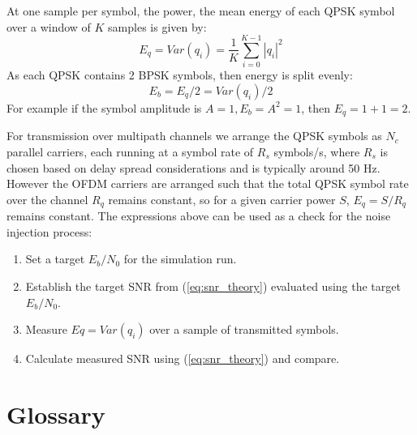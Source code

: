 \documentclass{article}
\begin{document}
At one sample per symbol, the power, the mean energy of each QPSK symbol over a window of $K$ samples is given by:
\begin{equation}
E_q = Var(q_i) = \frac{1}{K}\sum_{i=0}^{K-1}|q_i|^2
\end{equation}
As each QPSK contains 2 BPSK symbols, then energy is split evenly:
\begin{equation}
E_b = E_q/2 = Var(q_i)/2
\end{equation}
For example if the symbol amplitude is $A=1, E_b=A^2=1$, then $E_q=1+1=2$.

For transmission over multipath channels we arrange the QPSK symbols as $N_c$ parallel carriers, each running at a symbol rate of $R_s$ symbols/s, where $R_s$ is chosen based on delay spread considerations and is typically around 50 Hz.  However the OFDM carriers are arranged such that the total QPSK symbol rate over the channel $R_q$ remains constant, so for a given carrier power $S$, $E_q=S/R_q$ remains constant.  The expressions above can be used as a check for the noise injection process:
\begin{enumerate}
\item Set a target $E_b/N_0$ for the simulation run.
\item Establish the target SNR from (\ref{eq:snr_theory}) evaluated using the target $E_b/N_0$.
\item Measure $Eq=Var(q_i)$ over a sample of transmitted symbols.
\item Calculate measured SNR using (\ref{eq:snr_theory}) and compare. 
\end{enumerate}

\section{Glossary}
\end{document}

